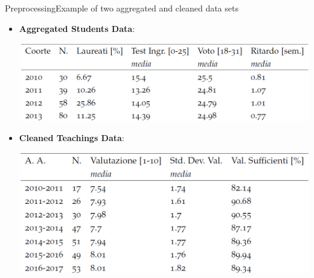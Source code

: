 \begin{frame}{Preprocessing}{Example of two aggregated and cleaned data sets}

\begin{itemize}
    \item<1->\textbf{Aggregated Students Data}:\\
        \noindent\begin{centering}
            \hspace*{1.0cm}\includegraphics[scale=0.175]{img7.png}
        \end{centering}
    \vspace{0.2cm}
    \item<2->\textbf{Cleaned Teachings Data}:\\
        \noindent\begin{centering}
            \hspace*{1.0cm}\includegraphics[scale=0.175]{img6.png}
        \end{centering}
\end{itemize}

\end{frame}

